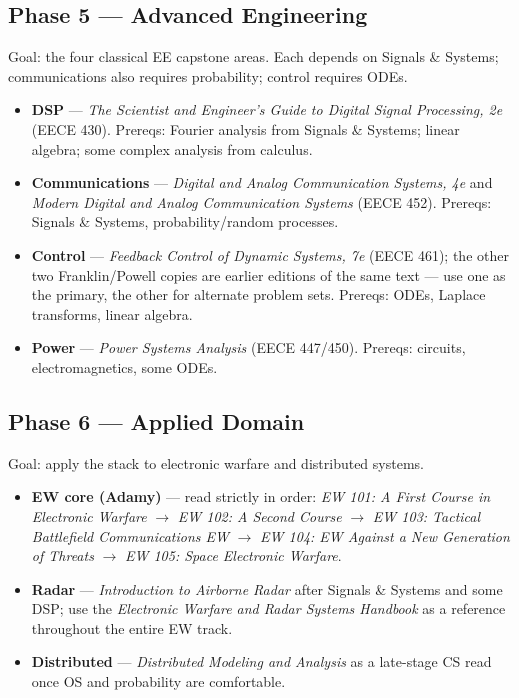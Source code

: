 \documentclass[11pt]{article}
\newcommand{\track}[2]{\textcolor{#1}{\textbf{#2}}}
\newcommand{\book}[1]{\textit{#1}}
\begin{document}
\subsection*{Phase 5 --- Advanced Engineering}
Goal: the four classical EE capstone areas. Each depends on Signals \&
Systems; communications also requires probability; control requires ODEs.
\begin{itemize}[leftmargin=1.2em, itemsep=2pt]
  \item \track{eececol}{DSP} --- \book{The Scientist and Engineer's Guide
        to Digital Signal Processing, 2e} (EECE 430). Prereqs: Fourier
        analysis from Signals \& Systems; linear algebra; some complex
        analysis from calculus.
  \item \track{eececol}{Communications} --- \book{Digital and Analog
        Communication Systems, 4e} and \book{Modern Digital and Analog
        Communication Systems} (EECE 452). Prereqs: Signals \& Systems,
        probability/random processes.
  \item \track{eececol}{Control} --- \book{Feedback Control of Dynamic
        Systems, 7e} (EECE 461); the other two Franklin/Powell copies are
        earlier editions of the same text --- use one as the primary, the
        other for alternate problem sets. Prereqs: ODEs, Laplace
        transforms, linear algebra.
  \item \track{eececol}{Power} --- \book{Power Systems Analysis}
        (EECE 447/450). Prereqs: circuits, electromagnetics, some ODEs.
\end{itemize}

\subsection*{Phase 6 --- Applied Domain}
Goal: apply the stack to electronic warfare and distributed systems.
\begin{itemize}[leftmargin=1.2em, itemsep=2pt]
  \item \track{ewcol}{EW core (Adamy)} --- read strictly in order:
        \book{EW 101: A First Course in Electronic Warfare} $\to$
        \book{EW 102: A Second Course} $\to$
        \book{EW 103: Tactical Battlefield Communications EW} $\to$
        \book{EW 104: EW Against a New Generation of Threats} $\to$
        \book{EW 105: Space Electronic Warfare}.
  \item \track{ewcol}{Radar} --- \book{Introduction to Airborne Radar}
        after Signals \& Systems and some DSP; use the \book{Electronic
        Warfare and Radar Systems Handbook} as a reference throughout the
        entire EW track.
  \item \track{cscol}{Distributed} --- \book{Distributed Modeling and
        Analysis} as a late-stage CS read once OS and probability are
        comfortable.
\end{itemize}
\end{document}
